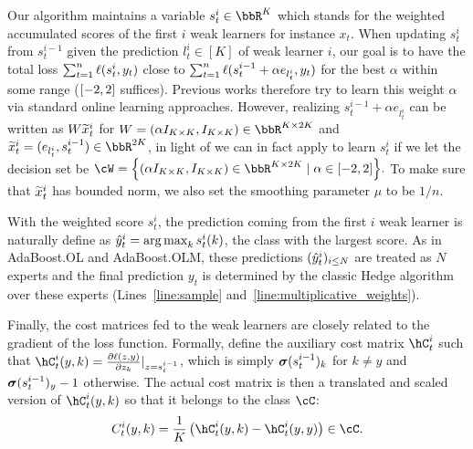 Our algorithm maintains a variable $s_t^i \in \bbR^{K}$ which stands for the weighted accumulated scores of the first $i$ weak learners for instance $x_t$.
When updating $s_t^{i}$ from $s_t^{i-1}$ given the prediction $l_t^i \in [K]$ of weak learner $i$,
our goal is to have the total loss $\sum_{t=1}^n \ls(s_t^{i}, y_t)$ close to $\sum_{t=1}^n \ls(s_t^{i-1}+\alpha e_{l_t^i} , y_t)$
for the best $\alpha$ within some range ($\brk*{-2,2}$ suffices).
Previous works therefore try to learn this weight $\alpha$ via standard online learning approaches.
However, realizing $s_t^{i-1}+\alpha e_{l_t^i}$ can be written as $W\wt{x}_{t}^{i}$
for $W = (\alpha{}I_{K\times{}K}, I_{K\times{}K}) \in \bbR^{K\times{}2K}$
and $\wt{x}_{t}^{i} = (e_{l_{t}^{i}}, s_{t}^{i-1})\in\bbR^{2K}$,
in light of 
we can in fact apply  to learn $s_t^{i}$ if we let the decision set be
$
\cW = \crl*{ (\alpha{}I_{K\times{}K}, I_{K\times{}K}) \in \bbR^{K\times{}2K}\mid{} \alpha\in\brk*{-2,2}}.
$
To make sure that $\wt{x}_{t}^{i}$ has bounded norm, we also set the smoothing parameter $\mu$ to be $1/n$.

With the weighted score $s_t^i$, the prediction coming from the first $i$ weak learner is naturally define as $\yh_t^i = \argmax_{k}s_{t}^{i}(k)$,
the class with the largest score. 
As in AdaBoost.OL and AdaBoost.OLM, 
these predictions $(\yh_t^i)_{i\leq N}$ are treated as $N$ experts and 
the final prediction $y_t$ is determined by the classic Hedge algorithm~\citep{freund1997decision} 
over these experts (Lines~\ref*{line:sample} and~\ref*{line:multiplicative_weights}).

Finally, the cost matrices fed to the weak learners are closely related to the gradient of the loss function.
Formally, define the auxiliary cost matrix $\hC_{t}^{i}$ such that $\hC_{t}^{i}(y, k) = \frac{\partial \ls(z, y)}{\partial z_k} |_{z=s_t^{i-1}}$,
which is simply $\mb{\sigma}(s_{t}^{i-1})_k$ for $k\neq y$ and $\mb{\sigma}(s_{t}^{i-1})_y - 1$ otherwise.
The actual cost matrix is then a translated and scaled version of $\hC_{t}^{i}(y, k)$ so that it belongs to the class $\cC$:
\begin{equation}
\label{eq:boosting_cost_matrix}
C_{t}^{i}(y, k) = \frac{1}{K}\left(\hC_{t}^{i}(y, k) - \hC_{t}^{i}(y, y)\right) \in \cC.
\end{equation}

